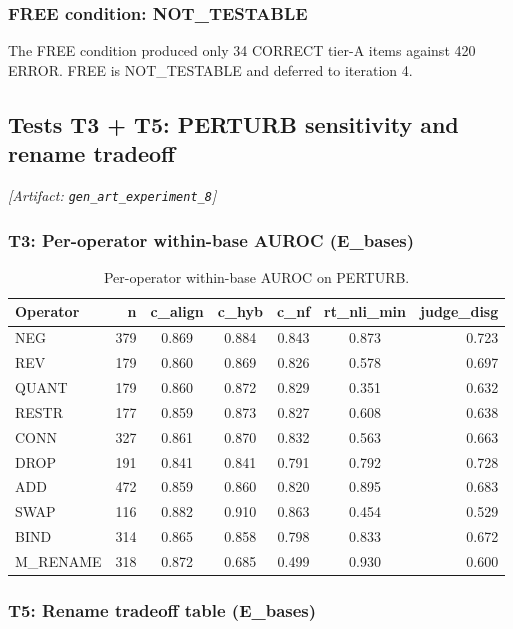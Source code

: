 \documentclass[11pt,letterpaper]{article}
\begin{document}
\subsubsection{FREE condition: NOT\_TESTABLE}

The FREE condition produced only 34 CORRECT tier-A items against 420 ERROR. FREE is NOT\_TESTABLE and deferred to iteration 4.

\subsection{Tests T3 + T5: PERTURB sensitivity and rename tradeoff}
\label{sec:t3t5}
\noindent\textit{[Artifact: \texttt{gen\_art\_experiment\_8}]}

\subsubsection{T3: Per-operator within-base AUROC (E\_bases)}

\begin{table}[!htbp]
\centering
\caption{Per-operator within-base AUROC on PERTURB.}
\label{tab:perturb_peroperator}
\begin{tabular}{lrccccr}
\toprule
Operator & n & c\_align & c\_hyb & c\_nf & rt\_nli\_min & judge\_disg \\
\midrule
NEG & 379 & 0.869 & 0.884 & 0.843 & 0.873 & 0.723 \\
REV & 179 & 0.860 & 0.869 & 0.826 & 0.578 & 0.697 \\
QUANT & 179 & 0.860 & 0.872 & 0.829 & 0.351 & 0.632 \\
RESTR & 177 & 0.859 & 0.873 & 0.827 & 0.608 & 0.638 \\
CONN & 327 & 0.861 & 0.870 & 0.832 & 0.563 & 0.663 \\
DROP & 191 & 0.841 & 0.841 & 0.791 & 0.792 & 0.728 \\
ADD & 472 & 0.859 & 0.860 & 0.820 & 0.895 & 0.683 \\
SWAP & 116 & 0.882 & 0.910 & 0.863 & 0.454 & 0.529 \\
BIND & 314 & 0.865 & 0.858 & 0.798 & 0.833 & 0.672 \\
M\_RENAME & 318 & 0.872 & 0.685 & 0.499 & 0.930 & 0.600 \\
\bottomrule
\end{tabular}
\end{table}

\subsubsection{T5: Rename tradeoff table (E\_bases)}
\end{document}
